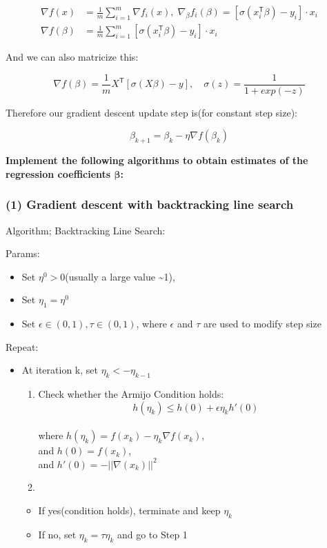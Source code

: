\documentclass[
  letterpaper,
  DIV=11,
  numbers=noendperiod]{scrartcl}
\providecommand{\tightlist}{%
  \setlength{\itemsep}{0pt}\setlength{\parskip}{0pt}}\usepackage{longtable,booktabs,array}
\begin{document}
\[
\begin{aligned}
\nabla f(x) &= \frac{1}{m} \sum_{i=1}^m \nabla f_i(x), \; \nabla_\beta f_i(\beta) = [\sigma(x_i^{\mathsf{T}} \beta) - y_i] \cdot x_i \\
\nabla f(\beta) &= {\frac{1}{m} \sum_{i=1}^m [\sigma(x_i^{\mathsf{T}} \beta) - y_i] \cdot x_i}
\end{aligned}
\]

And we can also matricize this:

\[
\boxed{\nabla f(\beta) = \frac{1}{m} X^{\mathsf{T}}[\sigma(X\beta) - y], \quad \sigma(z) = \frac{1}{1+exp(-z)}}
\]

Therefore our gradient descent update step is(for constant step size):

\[
\boxed {\beta_{k+1} = \beta_k - \eta \nabla f(\beta_k)}
\]

\textbf{Implement the following algorithms to obtain estimates of the
regression coefficients \(\symbf{β}\):}

\subsubsection{(1) Gradient descent with backtracking line
search}\label{gradient-descent-with-backtracking-line-search}

Algorithm; Backtracking Line Search:

Params:

\begin{itemize}
\tightlist
\item
  Set \(η^0 > 0\)(usually a large value \textasciitilde1),
\item
  Set \(η_1 = η^0\)
\item
  Set \(ϵ ∈ (0,1), τ ∈ (0,1)\), where \(ϵ\) and \(τ\) are used to modify
  step size
\end{itemize}

Repeat:

\begin{itemize}
\tightlist
\item
  At iteration k, set \(η_k <- η_{k-1}\)

  \begin{enumerate}
  \def\labelenumi{\arabic{enumi}.}
  \item
    Check whether the Armijo Condition holds: \[
    h(η_k) ≤ h(0) + ϵη_kh'(0)
    \]\\
    where \(h(η_k) = f(x_k) − η_k ∇f(x_k)\),\\
    and \(h(0) = f(x_k)\),\\
    and \(h'(0) = -||\nabla (x_k)||^2\)
  \item
  \end{enumerate}

  \begin{itemize}
  \tightlist
  \item
    If yes(condition holds), terminate and keep \(η_k\)
  \item
    If no, set \(η_k = τη_k\) and go to Step 1
  \end{itemize}
\end{itemize}
\end{document}
